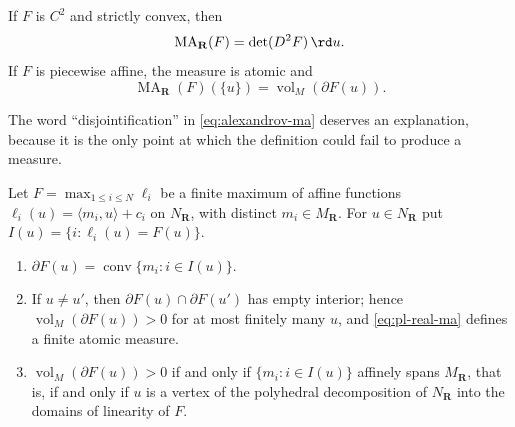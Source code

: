 If $F$ is $C^2$ and strictly convex, then
\begin{equation}
\label{eq:smooth-real-ma}
             \operatorname{MA}_{\mathbf R}(F)
             =\det(D^2F)\,\rd u.
\end{equation}
If $F$ is piecewise affine, the measure is atomic and
\begin{equation}
\label{eq:pl-real-ma}
 \operatorname{MA}_{\mathbf R}(F)(\{u\})
 =\operatorname{vol}_M(\partial F(u)).
\end{equation}

The word ``disjointification'' in \eqref{eq:alexandrov-ma} deserves an
explanation, because it is the only point at which the definition could fail
to produce a measure.

\begin{lemma}
\label{lem:ch08-alexandrov-polyhedral}
Let $F=\max_{1\leq i\leq N}\ell_i$ be a finite maximum of affine functions
$\ell_i(u)=\langle m_i,u\rangle+c_i$ on $N_{\mathbf R}$, with distinct
$m_i\in M_{\mathbf R}$.  For $u\in N_{\mathbf R}$ put
$I(u)=\{i:\ell_i(u)=F(u)\}$.
\begin{enumerate}
\item $\partial F(u)=\operatorname{conv}\{m_i:i\in I(u)\}$.
\item If $u\neq u'$, then $\partial F(u)\cap\partial F(u')$ has empty
interior; hence $\operatorname{vol}_M(\partial F(u))>0$ for at most finitely
many $u$, and \eqref{eq:pl-real-ma} defines a finite atomic measure.
\item $\operatorname{vol}_M(\partial F(u))>0$ if and only if
$\{m_i:i\in I(u)\}$ affinely spans $M_{\mathbf R}$, that is, if and only if
$u$ is a vertex of the polyhedral decomposition of $N_{\mathbf R}$ into the
domains of linearity of $F$.
\end{enumerate}
\end{lemma}

